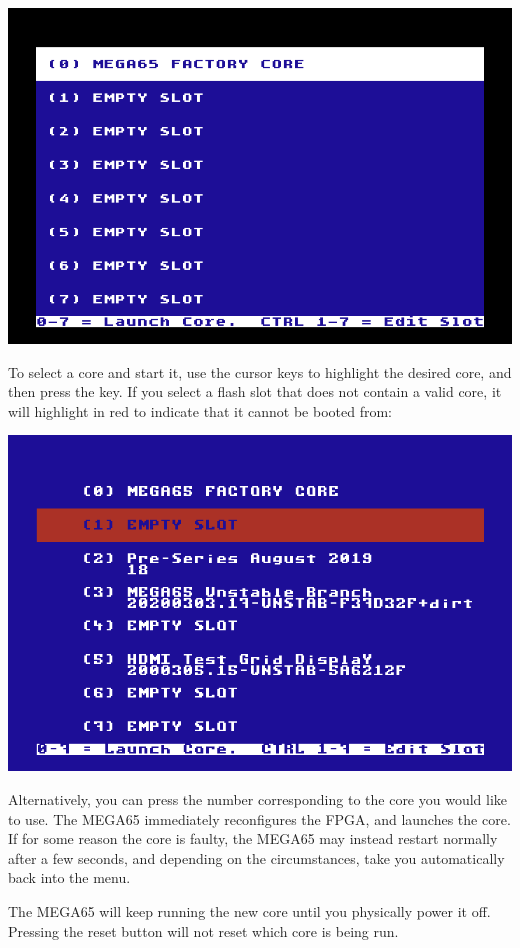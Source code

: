 \includegraphics[width=\linewidth]{images/ss-flashmenu.png}

To select a core and start it, use the cursor keys to highlight the desired core, and then press the
 key.  If you select a flash slot that does not
contain a valid core, it will highlight in red to indicate that it
cannot be booted from:

\includegraphics[width=\linewidth]{images/ss-flashmenu-invalidslot.png}

Alternatively, you can press the number corresponding to the core you would
like to use. The MEGA65 immediately reconfigures the FPGA, and launches the core.  If for some reason
the core is faulty, the MEGA65 may instead restart normally after a few seconds, and depending on the
circumstances, take you automatically back into the menu.

The MEGA65 will keep running the new core until you physically power it off.  Pressing the reset button
will not reset which core is being run.

